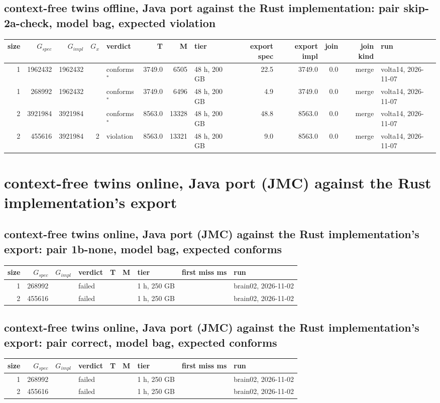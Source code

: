 \documentclass[10pt]{article}
\begin{document}
\subsection*{context-free twins offline, Java port against the Rust implementation: pair \textsf{skip-2a-check}, model bag, expected violation}
\begin{longtable}{@{}rrrrlrrlrrrrl@{}}
\toprule
size & $G_{\mathit{spec}}$ & $G_{\mathit{impl}}$ & $G_x$ & verdict & T & M & tier & export spec & export impl & join & join kind & run \\
\midrule
\endhead
\color{red} 1 & 1962432 & 1962432 &  & conforms$^{\ast}$ & 3749.0 & 6505 & 48 h, 200 GB & 22.5 & 3749.0 & 0.0 & merge & volta14, 2026-11-07 \\
\color{red} 1 & 268992 & 1962432 &  & conforms$^{\ast}$ & 3749.0 & 6496 & 48 h, 200 GB & 4.9 & 3749.0 & 0.0 & merge & volta14, 2026-11-07 \\
\color{red} 2 & 3921984 & 3921984 &  & conforms$^{\ast}$ & 8563.0 & 13328 & 48 h, 200 GB & 48.8 & 8563.0 & 0.0 & merge & volta14, 2026-11-07 \\
\color{red} 2 & 455616 & 3921984 & 2 & violation & 8563.0 & 13321 & 48 h, 200 GB & 9.0 & 8563.0 & 0.0 & merge & volta14, 2026-11-07 \\
\bottomrule
\end{longtable}
\section*{context-free twins online, Java port (JMC) against the Rust implementation's export}
\subsection*{context-free twins online, Java port (JMC) against the Rust implementation's export: pair \textsf{1b-none}, model bag, expected conforms}
\begin{longtable}{@{}rrrlrrlrl@{}}
\toprule
size & $G_{\mathit{spec}}$ & $G_{\mathit{impl}}$ & verdict & T & M & tier & first miss ms & run \\
\midrule
\endhead
\color{blue} 1 & 268992 &  & failed &  &  & 1 h, 250 GB &  & brain02, 2026-11-02 \\
\color{blue} 2 & 455616 &  & failed &  &  & 1 h, 250 GB &  & brain02, 2026-11-02 \\
\bottomrule
\end{longtable}
\subsection*{context-free twins online, Java port (JMC) against the Rust implementation's export: pair \textsf{correct}, model bag, expected conforms}
\begin{longtable}{@{}rrrlrrlrl@{}}
\toprule
size & $G_{\mathit{spec}}$ & $G_{\mathit{impl}}$ & verdict & T & M & tier & first miss ms & run \\
\midrule
\endhead
\color{blue} 1 & 268992 &  & failed &  &  & 1 h, 250 GB &  & brain02, 2026-11-02 \\
\color{blue} 2 & 455616 &  & failed &  &  & 1 h, 250 GB &  & brain02, 2026-11-02 \\
\bottomrule
\end{longtable}
\end{document}
